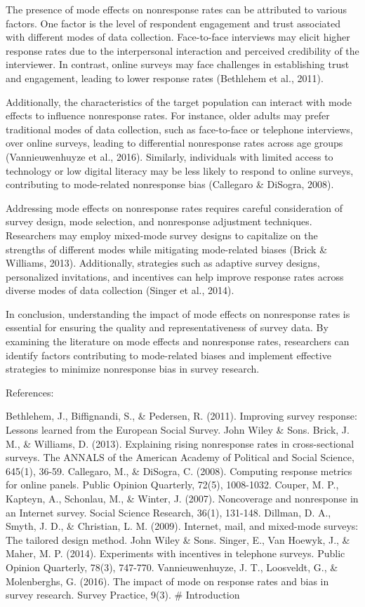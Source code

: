 \documentclass[
  letterpaper,
  DIV=11,
  numbers=noendperiod]{scrartcl}
\begin{document}
The presence of mode effects on nonresponse rates can be attributed to
various factors. One factor is the level of respondent engagement and
trust associated with different modes of data collection. Face-to-face
interviews may elicit higher response rates due to the interpersonal
interaction and perceived credibility of the interviewer. In contrast,
online surveys may face challenges in establishing trust and engagement,
leading to lower response rates (Bethlehem et al., 2011).

Additionally, the characteristics of the target population can interact
with mode effects to influence nonresponse rates. For instance, older
adults may prefer traditional modes of data collection, such as
face-to-face or telephone interviews, over online surveys, leading to
differential nonresponse rates across age groups (Vannieuwenhuyze et
al., 2016). Similarly, individuals with limited access to technology or
low digital literacy may be less likely to respond to online surveys,
contributing to mode-related nonresponse bias (Callegaro \& DiSogra,
2008).

Addressing mode effects on nonresponse rates requires careful
consideration of survey design, mode selection, and nonresponse
adjustment techniques. Researchers may employ mixed-mode survey designs
to capitalize on the strengths of different modes while mitigating
mode-related biases (Brick \& Williams, 2013). Additionally, strategies
such as adaptive survey designs, personalized invitations, and
incentives can help improve response rates across diverse modes of data
collection (Singer et al., 2014).

In conclusion, understanding the impact of mode effects on nonresponse
rates is essential for ensuring the quality and representativeness of
survey data. By examining the literature on mode effects and nonresponse
rates, researchers can identify factors contributing to mode-related
biases and implement effective strategies to minimize nonresponse bias
in survey research.

References:

Bethlehem, J., Biffignandi, S., \& Pedersen, R. (2011). Improving survey
response: Lessons learned from the European Social Survey. John Wiley \&
Sons. Brick, J. M., \& Williams, D. (2013). Explaining rising
nonresponse rates in cross-sectional surveys. The ANNALS of the American
Academy of Political and Social Science, 645(1), 36-59. Callegaro, M.,
\& DiSogra, C. (2008). Computing response metrics for online panels.
Public Opinion Quarterly, 72(5), 1008-1032. Couper, M. P., Kapteyn, A.,
Schonlau, M., \& Winter, J. (2007). Noncoverage and nonresponse in an
Internet survey. Social Science Research, 36(1), 131-148. Dillman, D.
A., Smyth, J. D., \& Christian, L. M. (2009). Internet, mail, and
mixed-mode surveys: The tailored design method. John Wiley \& Sons.
Singer, E., Van Hoewyk, J., \& Maher, M. P. (2014). Experiments with
incentives in telephone surveys. Public Opinion Quarterly, 78(3),
747-770. Vannieuwenhuyze, J. T., Loosveldt, G., \& Molenberghs, G.
(2016). The impact of mode on response rates and bias in survey
research. Survey Practice, 9(3). \# Introduction
\end{document}
